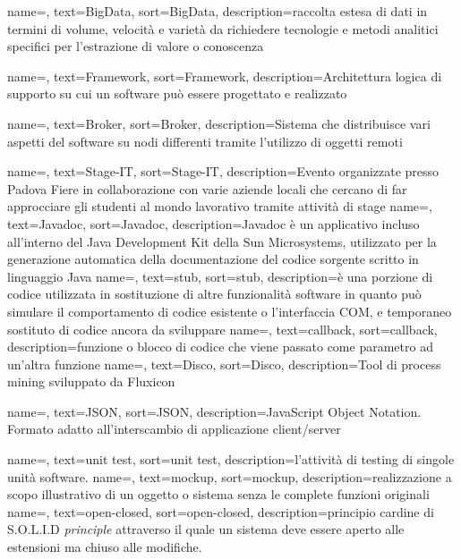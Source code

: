 {
    name=,
    text=BigData,
    sort=BigData,
    description={raccolta estesa di dati in termini di volume, velocità e varietà da richiedere tecnologie e metodi analitici specifici per l'estrazione di valore o conoscenza}
}

{
    name=,
    text=Framework,
    sort=Framework,
    description={Architettura logica di supporto su cui un software può essere progettato e realizzato}
}

{
    name=,
    text=Broker,
    sort=Broker,
    description={Sistema che distribuisce vari aspetti del software su nodi differenti tramite l'utilizzo di oggetti remoti}
}

{
    name=,
    text=Stage-IT,
    sort=Stage-IT,
    description={Evento organizzate presso Padova Fiere in collaborazione con varie aziende locali che cercano di far approcciare gli studenti al mondo lavorativo tramite attività di stage}
}
{
    name=,
    text=Javadoc,
    sort=Javadoc,
    description={Javadoc è un applicativo incluso all'interno del Java Development Kit della Sun Microsystems, utilizzato per la generazione automatica della documentazione del codice sorgente scritto in linguaggio Java}
}
{
    name=,
    text=stub,
    sort=stub,
    description={è una porzione di codice utilizzata in sostituzione di altre funzionalità software in quanto può simulare il comportamento di codice esistente o l'interfaccia COM, e temporaneo sostituto di codice ancora da sviluppare}
}
{
    name=,
    text=callback,
    sort=callback,
    description={funzione o blocco di codice che viene passato come parametro ad un'altra funzione}
}
{
    name=,
    text=Disco,
    sort=Disco,
    description={Tool di process mining sviluppato da Fluxicon}
}

{
    name=,
    text=JSON,
    sort=JSON,
    description={JavaScript Object Notation. Formato adatto all'interscambio di applicazione client/server}
}

{
    name=,
    text=unit test,
    sort=unit test,
    description={l'attività di testing di singole unità software.}
}
{
    name=,
    text=mockup,
    sort=mockup,
    description={realizzazione a scopo illustrativo di un oggetto o sistema senza le complete funzioni originali}
}
{
    name=,
    text=open-closed,
    sort=open-closed,
    description={principio cardine di S.O.L.I.D \textit{principle} attraverso il quale un sistema deve essere aperto alle estensioni ma chiuso alle modifiche.}
}